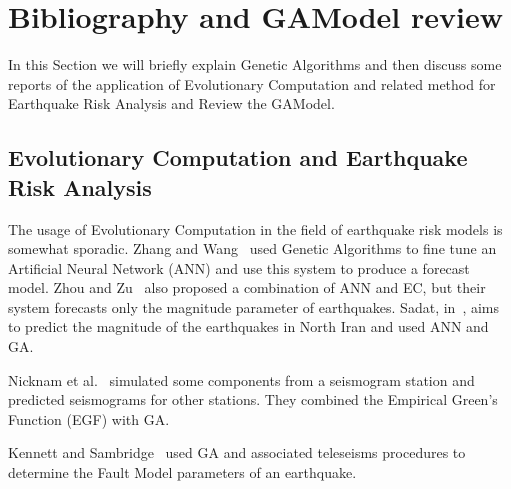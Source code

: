 \section{Bibliography and GAModel review}\label{estadoArte}
In this Section we will briefly explain Genetic Algorithms and then discuss some reports of the application of Evolutionary Computation and related method for Earthquake Risk Analysis and Review the GAModel.

\subsection{Evolutionary Computation and Earthquake Risk Analysis}

The usage of Evolutionary Computation in the field of earthquake risk models is somewhat sporadic. Zhang and Wang~\cite{Zhang2012} used Genetic Algorithms to fine tune an Artificial Neural Network (ANN) and use this system to produce a forecast model. Zhou and Zu~\cite{Feiyan2014} also proposed a combination of ANN and EC, but
their system forecasts only the magnitude parameter of earthquakes. Sadat, in~\cite{sadat2015application}, aims to predict the magnitude of the earthquakes in North Iran and used ANN and GA.

Nicknam et al.~\cite{Nicknam2010} simulated some components from a seismogram station and predicted seismograms for other stations. They combined the Empirical Green’s Function (EGF) with GA. %

Kennett and Sambridge~\cite{Kennett1992} used GA and associated teleseisms procedures to determine the Fault Model parameters of an earthquake. %

